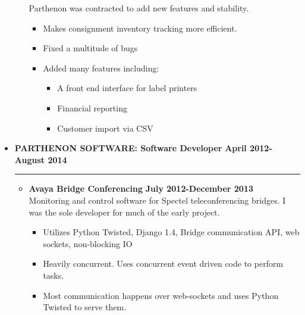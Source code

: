 \documentclass[overlapped]{res}
\begin{document}
\begin{resume}
\begin{itemize}[leftmargin=0in]
\begin{itemize}[leftmargin=0in]
\begin{samepage}
                    Parthenon was contracted to add new features and stability.
                    \begin{itemize}
                        \item[\textbullet] Makes consignment inventory tracking more efficient.
                        \item[\textbullet] Fixed a multitude of bugs
                        \item[\textbullet] Added many features including:
                            \begin{itemize} 
                                \item[\textbullet] A front end interface for label printers 
                                \item[\textbullet] Financial reporting
                                \item[\textbullet] Customer import via CSV 
                            \end{itemize}
                    \end{itemize}
                \end{samepage}
        \end{itemize}
        \vspace{0.125in}
    \item[] 
        \textbf{PARTHENON SOFTWARE: Software Developer} \hfill \textbf{April 2012-August 2014} \\[-0.1in] \rule{\textwidth}{0.5pt}
        \begin{itemize}[leftmargin=0in]
            \item[] 
                \begin{samepage}
                    \textbf{Avaya Bridge Conferencing} \hfill \textbf{July 2012-December 2013} \\
                    Monitoring and control software for Spectel teleconferencing bridges. I was the sole developer for much of the early project.
                    \begin{itemize}
                        \item[\textbullet] Utilizes Python Twisted, Django 1.4, Bridge communication API, web sockets, non-blocking IO
                        \item[\textbullet] Heavily concurrent. Uses concurrent event driven code to perform tasks.
                        \item[\textbullet] Most communication happens over web-sockets and uses Python Twisted to serve them.

\end{itemize}
\end{samepage}
\end{itemize}
\end{itemize}
\end{resume}
\end{document}
